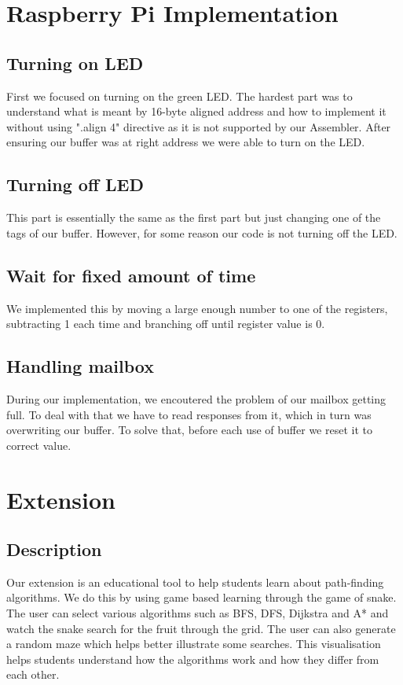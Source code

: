 \documentclass[11pt]{article}
\begin{document}
\section{Raspberry Pi Implementation}

\subsection{Turning on LED}
First we focused on turning on the green LED. The hardest part was to understand what is meant by 16-byte aligned address and 
how to implement it without using ".align 4" directive as it is not supported by our Assembler. After ensuring our buffer was 
at right address we were able to turn on the LED.

\subsection{Turning off LED}
This part is essentially the same as the first part but just changing one of the tags of our buffer. However, for some reason 
our code is not turning off the LED.

\subsection{Wait for fixed amount of time}
We implemented this by moving a large enough number to one of the registers, subtracting 1 each time and branching off 
until register value is 0.

\subsection{Handling mailbox}
During our implementation, we encoutered the problem of our mailbox getting full.
To deal with that we have to read responses from it, which in turn was overwriting our buffer. 
To solve that, before each use of buffer we reset it to correct value.

\section{Extension}

\subsection{Description}

Our extension is an educational tool to help students learn about path-finding algorithms. 
We do this by using game based learning through the game of snake. The user can select various algorithms 
such as BFS, DFS, Dijkstra and A* and watch the snake search for the fruit through the grid. 
The user can also generate a random maze which helps better illustrate some searches. 
This visualisation helps students understand how the algorithms work and how they differ from each other. 
\end{document}
